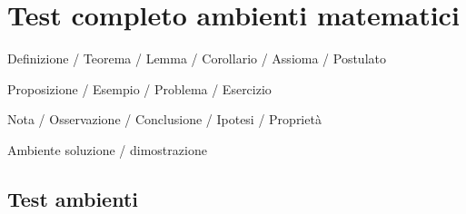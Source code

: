 \documentclass[it]{../../elegantbook}
\begin{document}
\chapter{Test completo ambienti matematici}
\begin{introduction}
\item Definizione / Teorema / Lemma / Corollario / Assioma / Postulato
\item Proposizione / Esempio / Problema / Esercizio
\item Nota / Osservazione / Conclusione / Ipotesi / Proprietà
\item Ambiente soluzione / dimostrazione
\end{introduction}

\section{Test ambienti}
\end{document}
